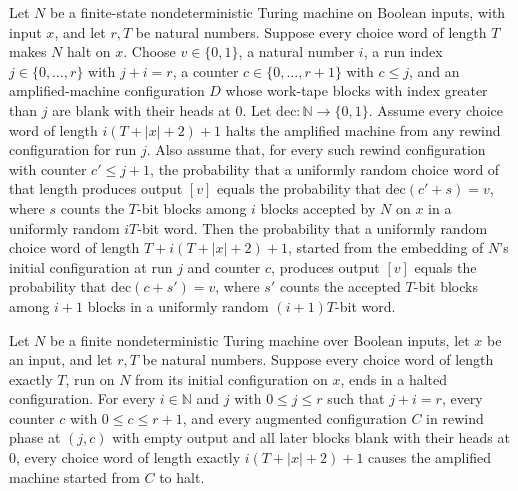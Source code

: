 \begin{theorem}
\label{Randomized.Amplify.run_prob}
\leanok
{}
Let $N$ be a finite-state nondeterministic Turing machine on Boolean inputs, with input
$x$, and let $r,T$ be natural numbers. Suppose every choice word of length $T$ makes $N$
halt on $x$. Choose $v\in\{0,1\}$, a natural number $i$, a run index
$j\in\{0,\ldots,r\}$ with $j+i=r$, a counter $c\in\{0,\ldots,r+1\}$ with $c\le j$, and
an amplified-machine configuration $D$ whose work-tape blocks with index greater than
$j$ are blank with their heads at $0$. Let $\mathrm{dec}:\mathbb{N}\to\{0,1\}$. Assume
every choice word of length $i(T+|x|+2)+1$ halts the amplified machine from any rewind
configuration for run $j$. Also assume that, for every such rewind configuration with
counter $c'\le j+1$, the probability that a uniformly random choice word of that length
produces output $[v]$ equals the probability that $\mathrm{dec}(c'+s)=v$, where $s$
counts the $T$-bit blocks among $i$ blocks accepted by $N$ on $x$ in a uniformly random
$iT$-bit word. Then the probability that a uniformly random choice word of length
$T+i(T+|x|+2)+1$, started from the embedding of $N$’s initial configuration at run $j$
and counter $c$, produces output $[v]$ equals the probability that
$\mathrm{dec}(c+s')=v$, where $s'$ counts the accepted $T$-bit blocks among $i+1$ blocks
in a uniformly random $(i+1)T$-bit word.
\end{theorem}

\begin{theorem}
\label{Randomized.Amplify.rewind_halts}
\leanok
{}
Let $N$ be a finite nondeterministic Turing machine over Boolean inputs, let $x$ be an
input, and let $r,T$ be natural numbers. Suppose every choice word of length exactly
$T$, run on $N$ from its initial configuration on $x$, ends in a halted configuration.
For every $i\in\mathbb N$ and $j$ with $0\le j\le r$ such that $j+i=r$, every counter
$c$ with $0\le c\le r+1$, and every augmented configuration $C$ in rewind phase at
$(j,c)$ with empty output and all later blocks blank with their heads at $0$, every
choice word of length exactly $i(T+|x|+2)+1$ causes the amplified machine started from
$C$ to halt.
\end{theorem}

